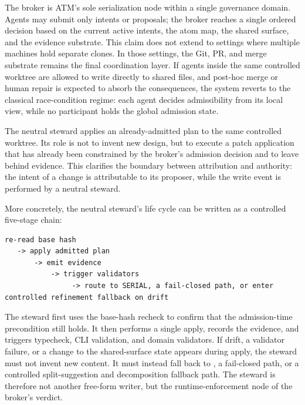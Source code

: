 \documentclass[9pt,letterpaper]{extarticle}
\begin{document}
The broker is ATM's sole serialization node within a single governance domain. Agents may submit only intents or proposals; the broker reaches a single ordered decision based on the current active intents, the atom map, the shared surface, and the evidence substrate. This claim does not extend to settings where multiple machines hold separate clones. In those settings, the Git, PR, and merge substrate remains the final coordination layer. If agents inside the same controlled worktree are allowed to write directly to shared files, and post-hoc merge or human repair is expected to absorb the consequences, the system reverts to the classical race-condition regime: each agent decides admissibility from its local view, while no participant holds the global admission state.

The neutral steward applies an already-admitted plan to the same controlled worktree. Its role is not to invent new design, but to execute a patch application that has already been constrained by the broker's admission decision and to leave behind evidence. This clarifies the boundary between attribution and authority: the intent of a change is attributable to its proposer, while the write event is performed by a neutral steward.

More concretely, the neutral steward's life cycle can be written as a controlled five-stage chain:

\begin{paperAlgoBox}
\begin{Verbatim}[breaklines=true,fontsize=\scriptsize]
re-read base hash
   -> apply admitted plan
       -> emit evidence
           -> trigger validators
                -> route to SERIAL, a fail-closed path, or enter controlled refinement fallback on drift
\end{Verbatim}
\end{paperAlgoBox}

The steward first uses the base-hash recheck to confirm that the admission-time precondition still holds. It then performs a single apply, records the evidence, and triggers typecheck, CLI validation, and domain validators. If drift, a validator failure, or a change to the shared-surface state appears during apply, the steward must not invent new content. It must instead fall back to \texttt{}, a fail-closed path, or a controlled split-suggestion and decomposition fallback path. The steward is therefore not another free-form writer, but the runtime-enforcement node of the broker's verdict.
\end{document}
